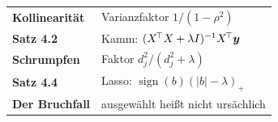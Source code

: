 \begin{merksatz}
\begin{center}
\renewcommand{\arraystretch}{1.5}
\begin{tabular}{@{}P{3.0cm}P{5.6cm}@{}}
\toprule
\textbf{Kollinearität} & Varianzfaktor $1/(1-\rho^{2})$\\
\textbf{Satz 4.2} & Kamm: $(X^{\!\top}X+\lambda I)^{-1}X^{\!\top}\boldsymbol{y}$\\
\textbf{Schrumpfen} & Faktor $d_j^{2}/(d_j^{2}+\lambda)$\\
\textbf{Satz 4.4} & Lasso: $\operatorname{sign}(b)(|b|-\lambda)_{+}$\\
\textbf{Der Bruchfall} & ausgewählt heißt nicht ursächlich\\
\bottomrule
\end{tabular}
\end{center}

\begin{center}
\begin{minipage}{0.88\textwidth}
\end{minipage}
\end{center}
\end{merksatz}
